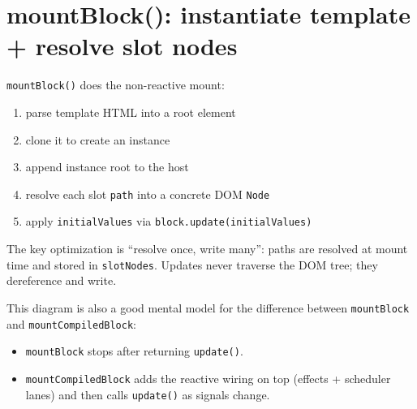 \section{mountBlock(): instantiate template + resolve slot nodes}

\texttt{mountBlock()} does the non-reactive mount:

\begin{enumerate}
  \item parse template HTML into a root element
  \item clone it to create an instance
  \item append instance root to the host
  \item resolve each slot \texttt{path} into a concrete DOM \texttt{Node}
  \item apply \texttt{initialValues} via \texttt{block.update(initialValues)}
\end{enumerate}

The key optimization is “resolve once, write many”: paths are resolved at mount time and stored in \texttt{slotNodes}. Updates never traverse the DOM tree; they dereference and write.

\begin{center}
\end{center}

This diagram is also a good mental model for the difference between \texttt{mountBlock} and \texttt{mountCompiledBlock}:

\begin{itemize}
  \item \texttt{mountBlock} stops after returning \texttt{update()}.
  \item \texttt{mountCompiledBlock} adds the reactive wiring on top (effects + scheduler lanes) and then calls \texttt{update()} as signals change.
\end{itemize}


